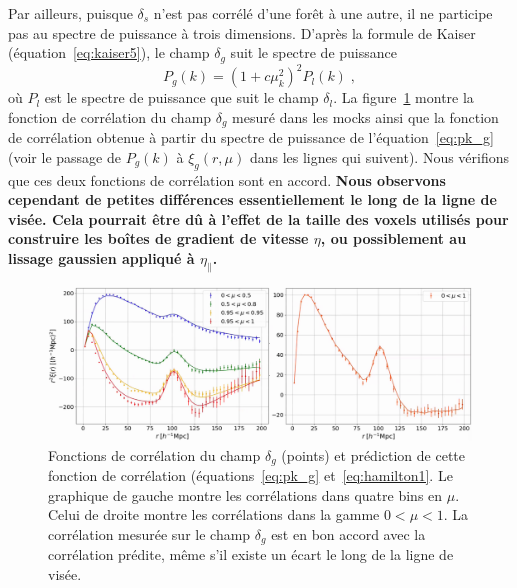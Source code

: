 Par ailleurs, puisque $\delta_s$ n'est pas corrélé d'une forêt à une autre, il ne participe pas au spectre de puissance à trois dimensions.
D'après la formule de Kaiser (équation~\ref{eq:kaiser5}), le champ $\delta_g$ suit le spectre de puissance
\begin{equation}
  \label{eq:pk_g}
    P_g(k) = (1 + c \mu_k^2)^2 P_l(k) \; ,
  \end{equation}
  où $P_l$ est le spectre de puissance que suit le champ $\delta_l$.
  La figure~\ref{fig:xi_g} montre la fonction de corrélation du champ $\delta_g$ mesuré dans les mocks ainsi que la fonction de corrélation obtenue à partir du spectre de puissance de l'équation~\ref{eq:pk_g} (voir le passage de $P_g(k)$ à $\xi_g(r,\mu)$ dans les lignes qui suivent). Nous vérifions que ces deux fonctions de corrélation sont en accord.
\textbf{  Nous observons cependant de petites différences essentiellement le long de la ligne de visée.
  Cela pourrait être dû à l'effet de la taille des voxels utilisés pour construire les boîtes de gradient de vitesse $\eta$, ou possiblement au lissage gaussien appliqué à $\eta_{\parallel}$.}
  \begin{figure}
    \centering
    \includegraphics[scale=0.4]{xi_g}
    \caption{Fonctions de corrélation du champ $\delta_g$ (points) et prédiction de cette fonction de corrélation (équations~\ref{eq:pk_g} et~\ref{eq:hamilton1}. Le graphique de gauche montre les corrélations dans quatre bins en $\mu$. Celui de droite montre les corrélations dans la gamme $0 < \mu < 1$. La corrélation mesurée sur le champ $\delta_g$ est en bon accord avec la corrélation prédite, même s'il existe un écart le long de la ligne de visée.}
    \label{fig:xi_g}
  \end{figure}

